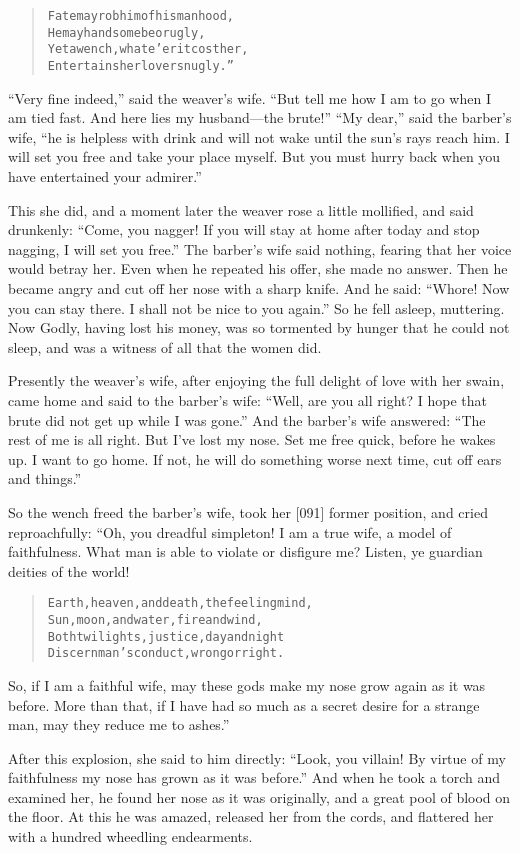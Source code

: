 \documentclass[article, twoside, 14pt]{memoir}
\renewenvironment{verbatim}{%
\begin{quote}%
\vskip -10pt%
\begin{alltt}\normalfont\large}{\end{alltt}%
\end{quote}%
\vskip -10pt
} %
\begin{document}
\begin{verbatim}
Fate may rob him of his manhood,
He may handsome be or ugly,
Yet a wench, whate'er it cost her,
Entertains her lover snugly.”
\end{verbatim}
``Very fine indeed,'' said the weaver's wife.
``But tell me how I am to go when I am tied fast. And here lies my husband---the brute!''
``My dear,'' said the barber's wife,
``he is helpless with drink and will not wake until the sun's rays reach him. I will set you free and take your place myself. But you must hurry back when you have entertained your admirer.''

This she did, and a moment later the weaver rose a little
mollified, and said drunkenly:
``Come, you nagger! If you will stay at home after today and stop nagging, I will set you free.''
The barber's wife said nothing, fearing that her voice would betray
her. Even when he repeated his offer, she made no answer. Then he
became angry and cut off her nose with a sharp knife. And he said:
``Whore! Now you can stay there. I shall not be nice to you again.''
So he fell asleep, muttering. Now Godly, having lost his money, was
so tormented by hunger that he could not sleep, and was a witness
of all that the women did.

Presently the weaver's wife, after enjoying the full delight of
love with her swain, came home and said to the barber's wife:
``Well, are you all right? I hope that brute did not get up while I was gone.''
And the barber's wife answered:
``The rest of me is all right. But I've lost my nose. Set me free quick, before he wakes up. I want to go home. If not, he will do something worse next time, cut off ears and things.''

So the wench freed the barber's wife, took her [091] former
position, and cried reproachfully: “Oh, you dreadful simpleton! I
am a true wife, a model of faithfulness. What man is able to
violate or disfigure me? Listen, ye guardian deities of the world!

\begin{verbatim}
Earth, heaven, and death, the feeling mind,
Sun, moon, and water, fire and wind,
Both twilights, justice, day and night
Discern man's conduct, wrong or right.
\end{verbatim}
So, if I am a faithful wife, may these gods make my nose grow again
as it was before. More than that, if I have had so much as a secret
desire for a strange man, may they reduce me to ashes.”

After this explosion, she said to him directly:
``Look, you villain! By virtue of my faithfulness my nose has grown as it was before.''
And when he took a torch and examined her, he found her nose as it
was originally, and a great pool of blood on the floor. At this he
was amazed, released her from the cords, and flattered her with a
hundred wheedling endearments.
\end{document}
